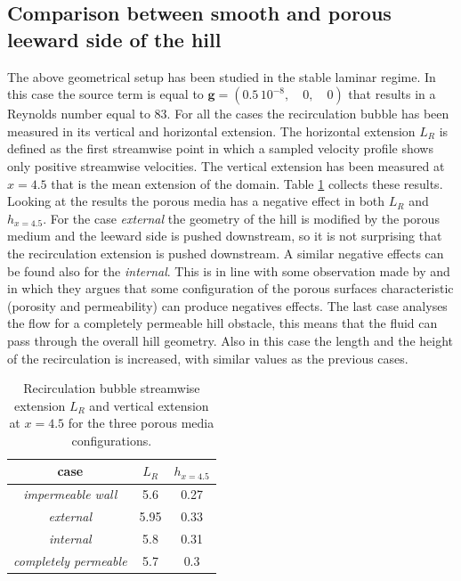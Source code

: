 \subsection{Comparison between smooth and porous leeward side of the hill}

The above geometrical setup has been studied in the stable laminar regime. In this case the source term is equal to $\mathbf{g} = (0.5 \,10^{-8}, \quad0, \quad0)$ that results in a Reynolds number equal to $83$.
For all the cases the recirculation bubble has been measured in its vertical and horizontal extension. The horizontal extension $L_R$ is defined as the first streamwise point in which a sampled velocity profile shows only positive streamwise velocities. The vertical extension has been measured at $x=4.5$ that is the mean extension of the domain.
Table \ref{tb:bubble} collects these results. Looking at the results the porous media has a negative effect in both $L_R$ and $h_{x=4.5}$. For the case \textit{external} the geometry of the hill is modified by the porous medium and the leeward side is pushed downstream, so it is not surprising that the recirculation extension is pushed downstream. A similar negative effects can be found also for the \textit{internal}. This is in line with some observation made by \citet{jimenez2001turbulent} and \citet{segura2017permeable} in which they argues that some configuration of the porous surfaces characteristic (porosity and permeability) can produce negatives effects. The last case analyses the flow for a completely permeable hill obstacle, this means that the fluid can pass through the overall hill geometry. Also in this case the length and the height of the recirculation is increased, with similar values as the previous cases.
\begin{table}[h]
	\centering
	\begin{tabular}{c|c|c}
		case & $L_R$ & $h_{x=4.5}$ \\ 
		\hline 
		\hline 
		\textit{impermeable wall} & 5.6 & 0.27 \\ 
		\hline 
		\textit{external} & 5.95 & 0.33 \\ 
		\hline 
		\textit{internal} & 5.8 & 0.31 \\ 
		\hline 
		\textit{completely permeable} & 5.7 & 0.3 \\ 
		\hline 
		\hline 
	\end{tabular}
	\caption{Recirculation bubble streamwise extension $L_R$ and vertical extension at $x=4.5$ for the three porous media configurations.}
	\label{tb:bubble}
\end{table}

